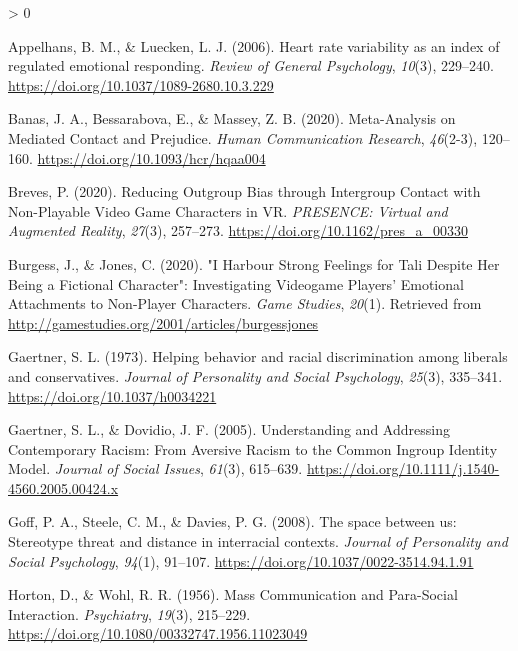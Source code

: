 \documentclass[
  english,
  man, noextraspace,floatsintext]{apa6}
\newlength{\cslhangindent}
\newenvironment{CSLReferences}[2] %
 {%
  \setlength{\parindent}{0pt}
  \ifodd #1 \everypar{\setlength{\hangindent}{\cslhangindent}}\ignorespaces\fi
  \ifnum #2 > 0
  \setlength{\parskip}{#2\baselineskip}
  \fi
 }%
 {}
\begin{document}
\hypertarget{refs}{}
\begin{CSLReferences}{1}{0}
\leavevmode\hypertarget{ref-appelhansHeartRateVariability2006}{}%
Appelhans, B. M., \& Luecken, L. J. (2006). Heart rate variability as an index of regulated emotional responding. \emph{Review of General Psychology}, \emph{10}(3), 229--240. \url{https://doi.org/10.1037/1089-2680.10.3.229}

\leavevmode\hypertarget{ref-banasMetaAnalysisMediatedContact2020}{}%
Banas, J. A., Bessarabova, E., \& Massey, Z. B. (2020). Meta-{Analysis} on {Mediated Contact} and {Prejudice}. \emph{Human Communication Research}, \emph{46}(2-3), 120--160. \url{https://doi.org/10.1093/hcr/hqaa004}

\leavevmode\hypertarget{ref-brevesReducingOutgroupBias2020}{}%
Breves, P. (2020). Reducing {Outgroup Bias} through {Intergroup Contact} with {Non}-{Playable Video Game Characters} in {VR}. \emph{PRESENCE: Virtual and Augmented Reality}, \emph{27}(3), 257--273. \url{https://doi.org/10.1162/pres_a_00330}

\leavevmode\hypertarget{ref-burgessHarbourStrongFeelings2020}{}%
Burgess, J., \& Jones, C. (2020). {"}{I Harbour Strong Feelings} for {Tali Despite Her Being} a {Fictional Character}{"}: {Investigating Videogame Players}' {Emotional Attachments} to {Non}-{Player Characters}. \emph{Game Studies}, \emph{20}(1). Retrieved from \url{http://gamestudies.org/2001/articles/burgessjones}

\leavevmode\hypertarget{ref-gaertnerHelpingBehaviorRacial1973}{}%
Gaertner, S. L. (1973). Helping behavior and racial discrimination among liberals and conservatives. \emph{Journal of Personality and Social Psychology}, \emph{25}(3), 335--341. \url{https://doi.org/10.1037/h0034221}

\leavevmode\hypertarget{ref-gaertnerUnderstandingAddressingContemporary2005}{}%
Gaertner, S. L., \& Dovidio, J. F. (2005). Understanding and {Addressing Contemporary Racism}: {From Aversive Racism} to the {Common Ingroup Identity Model}. \emph{Journal of Social Issues}, \emph{61}(3), 615--639. \url{https://doi.org/10.1111/j.1540-4560.2005.00424.x}

\leavevmode\hypertarget{ref-goffSpaceUsStereotype2008}{}%
Goff, P. A., Steele, C. M., \& Davies, P. G. (2008). The space between us: {Stereotype} threat and distance in interracial contexts. \emph{Journal of Personality and Social Psychology}, \emph{94}(1), 91--107. \url{https://doi.org/10.1037/0022-3514.94.1.91}

\leavevmode\hypertarget{ref-hortonMassCommunicationParaSocial1956}{}%
Horton, D., \& Wohl, R. R. (1956). Mass {Communication} and {Para}-{Social Interaction}. \emph{Psychiatry}, \emph{19}(3), 215--229. \url{https://doi.org/10.1080/00332747.1956.11023049}


\end{CSLReferences}
\end{document}

